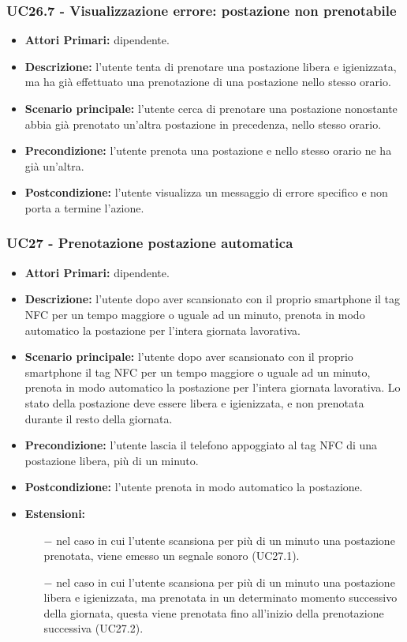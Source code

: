 \subsubsection{ UC26.7 - Visualizzazione errore: postazione non prenotabile }
\begin{itemize}
	\item\textbf{Attori Primari:} dipendente.
	\item\textbf{Descrizione:} l’utente tenta di prenotare una postazione libera e igienizzata, ma ha già effettuato una prenotazione di una postazione nello stesso orario.
	\item\textbf{Scenario principale:} l'utente cerca di prenotare una postazione nonostante abbia già prenotato un'altra postazione in precedenza, nello stesso orario.
	\item\textbf{Precondizione:} l'utente prenota una postazione e nello stesso orario ne ha già un'altra.
	\item\textbf{Postcondizione:} l’utente visualizza un messaggio di errore specifico e non porta a termine l’azione.
\end{itemize}

\subsubsection{ UC27 - Prenotazione postazione automatica}
\begin{itemize}
	\item\textbf{Attori Primari:} dipendente.
	\item\textbf{Descrizione:} l’utente dopo aver scansionato con il proprio smartphone il tag NFC per un tempo maggiore o uguale ad un minuto, prenota in modo automatico la postazione per l'intera giornata lavorativa. 
	\item\textbf{Scenario principale:} l’utente dopo aver scansionato con il proprio smartphone il tag NFC per un tempo maggiore o uguale ad un minuto, prenota in modo automatico la postazione per l'intera giornata lavorativa. Lo stato della postazione deve essere libera e igienizzata, e non prenotata durante il resto della giornata.
	\item\textbf{Precondizione:} l'utente lascia il telefono appoggiato al tag NFC di una postazione libera, più di un minuto.
	\item\textbf{Postcondizione:} l'utente prenota in modo automatico la postazione.
	\item\textbf{Estensioni:}
	\begin{itemize}
		\item[$-$] nel caso in cui l'utente scansiona per più di un minuto una postazione prenotata, viene emesso un segnale sonoro (UC27.1).
		\item[$-$] nel caso in cui l'utente scansiona per più di un minuto una postazione libera e igienizzata, ma prenotata in un determinato momento successivo della giornata, questa viene prenotata fino all'inizio della prenotazione successiva (UC27.2).
	\end{itemize}
\end{itemize}
